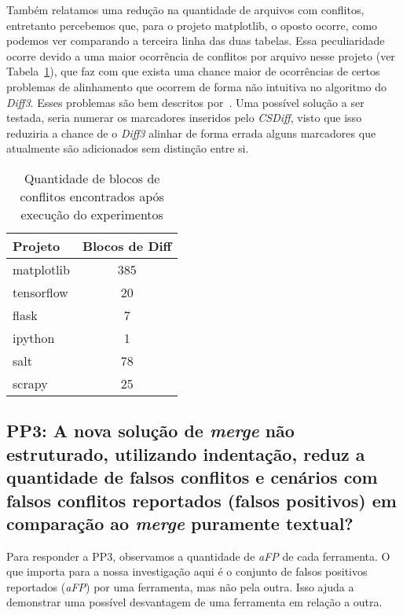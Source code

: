 Também relatamos uma redução na quantidade de arquivos com conflitos, entretanto percebemos que,
para o projeto matplotlib, o oposto ocorre, como podemos ver comparando a terceira linha das duas tabelas. Essa peculiaridade
ocorre devido a uma maior ocorrência de conflitos por arquivo nesse projeto (ver Tabela~\ref{block_diff}), que faz com que
exista uma chance maior de ocorrências de certos problemas de alinhamento que ocorrem de forma não intuitiva no algoritmo do
\emph{Diff3}. Esses problemas são bem descritos por~\cite{khan07}. Uma possível solução a ser testada, seria numerar os marcadores
inseridos pelo \emph{CSDiff}, visto que isso reduziria a chance de o \emph{Diff3} alinhar de forma errada alguns marcadores que atualmente
são adicionados sem distinção entre si.

\begin{table}[ht]
	\begin{center}
		\begin{tabular}{|l|c|}
			\hline
			\textbf{Projeto} & \textbf{Blocos de Diff} \\
			\hline
			matplotlib       & 385                     \\
			tensorflow       & 20                      \\
			flask            & 7                       \\
			ipython          & 1                       \\
			salt             & 78                      \\
			scrapy           & 25                      \\
			\hline
		\end{tabular}
	\end{center}
	\caption{Quantidade de blocos de conflitos encontrados após execução do experimentos}\label{block_diff}
\end{table}

\subsection{PP3: A nova solução de \emph{merge} não estruturado, utilizando indentação,
	reduz a quantidade de falsos conflitos e cenários com falsos conflitos reportados
	(falsos positivos) em comparação ao \emph{merge} puramente textual?}
Para responder a PP3, observamos a quantidade de \emph{aFP} de cada ferramenta.
O que importa para a nossa investigação aqui é o conjunto de falsos positivos reportados (\emph{aFP})
por uma ferramenta, mas não pela outra. Isso ajuda a demonstrar uma possível desvantagem de
uma ferramenta em relação a outra.


